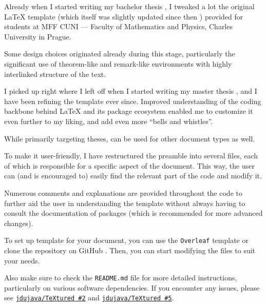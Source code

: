  \label{ch:Introduction}

Already when I started writing my bachelor thesis \autocite{Dujava2022}, I tweaked a lot the original \LaTeX{} template (which itself was slightly updated since then \autocite{MaresTemplate}) provided for students at MFF CUNI --- Faculty of Mathematics and Physics, Charles University in Prague.

Some design choices originated already during this stage, particularly the significant use of theorem-like and remark-like environments with highly interlinked structure of the text.

I picked up right where I left off when I started writing my master thesis \autocite{TODO}, and I have been refining the template ever since.
Improved understanding of the coding backbone behind \LaTeX{} and its package ecosystem enabled me to customize it even further to my liking, and add even more \enquote{bells and whistles}.

\begin{remark}
    While primarily targeting theses, \TeXtured{} can be used for other document types as well.
\end{remark}

To make it user-friendly, I have restructured the preamble into several files, each of which is responsible for a specific aspect of the document.
This way, the user can (and is encouraged to) easily find the relevant part of the code and modify it.

Numerous comments and explanations are provided throughout the code to further aid the user in understanding the template without always having to consult the documentation of packages (which is recommended for more advanced changes).

\begin{remark}
    To set up \TeXtured{} template for your document, you can use the \texttt{Overleaf} template or clone the repository on \textsf{GitHub} \autocite{TeXtured}.
    Then, you can start modifying the files to suit your needs.

    Also make sure to check the \texttt{README.md} file for more detailed instructions, particularly on various software dependencies.
    If you encounter any issues, please see \href{https://github.com/jdujava/TeXtured/issues/2}{\texttt{jdujava/TeXtured \#2}} and \href{https://github.com/jdujava/TeXtured/issues/5}{\texttt{jdujava/TeXtured \#5}}.
\end{remark}
